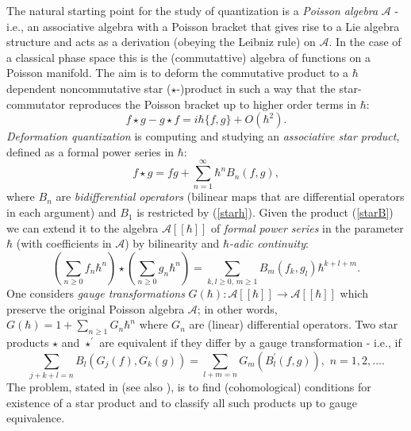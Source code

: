 The natural starting point for the study of quantization is a {\it Poisson algebra} ${\mathcal A}$ - i.e., an associative 
algebra with a Poisson bracket that gives rise to a Lie algebra structure and acts as a derivation (obeying the Leibniz rule) 
on ${\mathcal A}$. In the case of a classical phase space this is the (commutattive) algebra of functions on a Poisson manifold.
The aim is to deform the commutative product to a $\hbar$ dependent noncommutative star ($\star$-)product in 
such a way that the star-commutator reproduces the Poisson bracket up to higher order terms in $\hbar$:
\begin{equation}
\label{starh}
f\star g - g\star f = i\hbar\{f, g\} + O(\hbar^2).
\end{equation}
{\it Deformation quantization} is computing and studying an {\it associative star product}, 
defined as a formal power series in $\hbar$: 
\begin{equation}
\label{starB}
f\star g = fg + \sum_{n=1}^\infty \hbar^n B_n(f, g),
\end{equation}
where $B_n$ are {\it bidifferential operators} (bilinear maps that are differential operators in each argument) and $B_1$ is
restricted by (\ref{starh}). Given the product (\ref{starB}) we can extend it to the algebra ${\mathcal A}[[\hbar]]$ of {\it 
formal power series} in the parameter $\hbar$ (with coefficients in ${\mathcal A}$) by bilinearity and {\it $\hbar$-adic continuity}:
\begin{equation}
(\sum_{n\geq 0}f_n\hbar^n)\star (\sum_{n\geq 0}g_n\hbar^n) = \sum_{k,l\geq 0, \, m\geq 1} B_m(f_k, g_l)\hbar^{k+l+m}.
\end{equation}
One considers \cite{W94} {\it gauge transformations} $G(\hbar): {\mathcal A}[[\hbar]] \rightarrow {\mathcal A}[[\hbar]]$ which preserve
the original Poisson algebra ${\mathcal A}$; in other words, $G(\hbar) = 1 + \sum_{n\geq 1} G_n \hbar^n$ where $G_n$ are (linear) 
differential operators. Two star products $\star$ and $\star^{'}$ are equivalent if they differ by a gauge transformation - i.e., if 
\begin{equation}
\label{equiv}
\sum_{j+k+l=n}B_l(G_j(f), G_k(g)) = \sum_{l+m=n} G_m(B^{'}_l(f, g)), \, \, n = 1, 2, ... . 
\end{equation}
The problem, stated in \cite{BFLS} (see also \cite{W94}), is to find (cohomological) conditions for existence of a star product and to classify all such products up to gauge equivalence.

